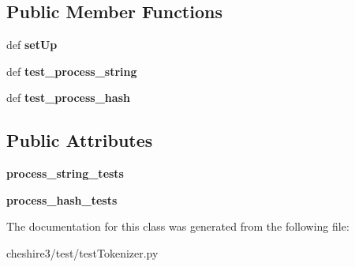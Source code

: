 \subsection*{Public Member Functions}
\begin{DoxyCompactItemize}
\item 
\hypertarget{classcheshire3_1_1test_1_1test_tokenizer_1_1_tokenizer_test_case_a7133a84cf7ff18c7307778690d949126}{def {\bfseries set\-Up}}\label{classcheshire3_1_1test_1_1test_tokenizer_1_1_tokenizer_test_case_a7133a84cf7ff18c7307778690d949126}

\item 
\hypertarget{classcheshire3_1_1test_1_1test_tokenizer_1_1_tokenizer_test_case_a5ac692d6f8eabee9875c37d891fba887}{def {\bfseries test\-\_\-process\-\_\-string}}\label{classcheshire3_1_1test_1_1test_tokenizer_1_1_tokenizer_test_case_a5ac692d6f8eabee9875c37d891fba887}

\item 
\hypertarget{classcheshire3_1_1test_1_1test_tokenizer_1_1_tokenizer_test_case_ac3953f62c23bce8948a7846603fcafcf}{def {\bfseries test\-\_\-process\-\_\-hash}}\label{classcheshire3_1_1test_1_1test_tokenizer_1_1_tokenizer_test_case_ac3953f62c23bce8948a7846603fcafcf}

\end{DoxyCompactItemize}
\subsection*{Public Attributes}
\begin{DoxyCompactItemize}
\item 
\hypertarget{classcheshire3_1_1test_1_1test_tokenizer_1_1_tokenizer_test_case_a6d3fb6bec89f7da295891d0fe4674f6e}{{\bfseries process\-\_\-string\-\_\-tests}}\label{classcheshire3_1_1test_1_1test_tokenizer_1_1_tokenizer_test_case_a6d3fb6bec89f7da295891d0fe4674f6e}

\item 
\hypertarget{classcheshire3_1_1test_1_1test_tokenizer_1_1_tokenizer_test_case_a8879b8e3b7d78c69b9a344a8375a1bd4}{{\bfseries process\-\_\-hash\-\_\-tests}}\label{classcheshire3_1_1test_1_1test_tokenizer_1_1_tokenizer_test_case_a8879b8e3b7d78c69b9a344a8375a1bd4}

\end{DoxyCompactItemize}


The documentation for this class was generated from the following file\-:\begin{DoxyCompactItemize}
\item 
cheshire3/test/test\-Tokenizer.\-py\end{DoxyCompactItemize}
